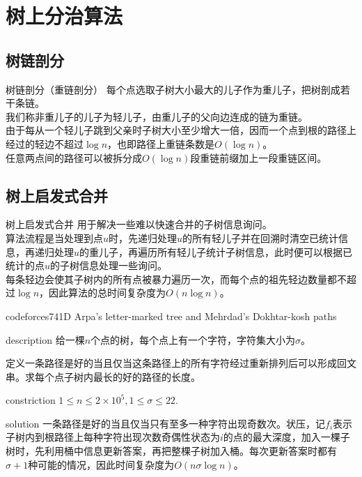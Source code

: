 \documentclass{beamer}
\begin{document}
	\section{树上分治算法}
	\subsection{树链剖分}
	\begin{frame}{树链剖分（重链剖分）}
		每个点选取子树大小最大的儿子作为重儿子，把树剖成若干条链。\\
		
		我们称非重儿子的儿子为轻儿子，由重儿子的父向边连成的链为重链。\\
		
		由于每从一个轻儿子跳到父亲时子树大小至少增大一倍，因而一个点到根的路径上经过的轻边不超过$\log n$，也即路径上重链条数是$O(\log n)$。\\
		
		任意两点间的路径可以被拆分成$O(\log n)$段重链前缀加上一段重链区间。
	\end{frame}
	\subsection{树上启发式合并}
	\begin{frame}{树上启发式合并}
		用于解决一些难以快速合并的子树信息询问。\\
		
		算法流程是当处理到点$u$时，先递归处理$u$的所有轻儿子并在回溯时清空已统计信息，再递归处理$u$的重儿子，再遍历所有轻儿子统计子树信息，此时便可以根据已统计的点$u$的子树信息处理一些询问。\\
		
		每条轻边会使其子树内的所有点被暴力遍历一次，而每个点的祖先轻边数量都不超过$\log n$，因此算法的总时间复杂度为$O(n\log n)$。
	\end{frame}
	\begin{frame}{codeforces741D Arpa's letter-marked tree and Mehrdad's Dokhtar-kosh paths}
		\begin{block}{description}
			给一棵$n$个点的树，每个点上有一个字符，字符集大小为$\sigma$。
			
			定义一条路径是好的当且仅当这条路径上的所有字符经过重新排列后可以形成回文串。求每个点子树内最长的好的路径的长度。
		\end{block}
		\begin{block}{constriction}
			$1 \le n \le 2\times 10^5, 1 \le \sigma \le 22.$
		\end{block}
		\pause
		\begin{block}{solution}
			一条路径是好的当且仅当只有至多一种字符出现奇数次。状压，记$f_i$表示子树内到根路径上每种字符出现次数奇偶性状态为$i$的点的最大深度，加入一棵子树时，先利用桶中信息更新答案，再把整棵子树加入桶。每次更新答案时都有$\sigma +1$种可能的情况，因此时间复杂度为$O(n\sigma\log n)$。
		\end{block}
	\end{frame}
\end{document}
